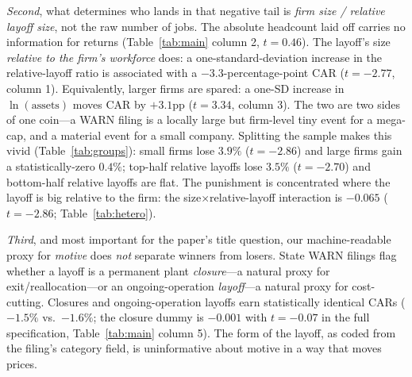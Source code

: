 \documentclass[12pt]{article}
\begin{document}
\emph{Second}, what determines who lands in that negative tail is \emph{firm
size / relative layoff size}, not the raw number of jobs. The absolute headcount
laid off carries no information for returns (Table~\ref{tab:main} column 2,
$t=0.46$). The layoff's size \emph{relative to the firm's workforce} does: a
one-standard-deviation increase in the relative-layoff ratio is associated with a
$-3.3$-percentage-point CAR ($t=-2.77$, column 1). Equivalently, larger firms are
spared: a one-SD increase in $\ln(\text{assets})$ moves CAR by $+3.1$pp
($t=3.34$, column 3). The two are two sides of one coin---a WARN filing is a
locally large but firm-level tiny event for a mega-cap, and a material event for a
small company. Splitting the sample makes this vivid (Table~\ref{tab:groups}):
small firms lose $3.9\%$ ($t=-2.86$) and large firms gain a statistically-zero
$0.4\%$; top-half relative layoffs lose $3.5\%$ ($t=-2.70$) and bottom-half
relative layoffs are flat. The punishment is concentrated where the layoff is big
relative to the firm: the size$\times$relative-layoff interaction is $-0.065$
($t=-2.86$; Table~\ref{tab:hetero}).

\emph{Third}, and most important for the paper's title question, our
machine-readable proxy for \emph{motive} does \emph{not} separate winners from
losers. State WARN filings flag whether a layoff is a permanent plant
\emph{closure}---a natural proxy for exit/reallocation---or an ongoing-operation
\emph{layoff}---a natural proxy for cost-cutting. Closures and ongoing-operation
layoffs earn statistically identical CARs ($-1.5\%$ vs.\ $-1.6\%$; the closure
dummy is $-0.001$ with $t=-0.07$ in the full specification,
Table~\ref{tab:main} column 5). The form of the layoff, as coded from the filing's
category field, is uninformative about motive in a way that moves prices.
\end{document}
